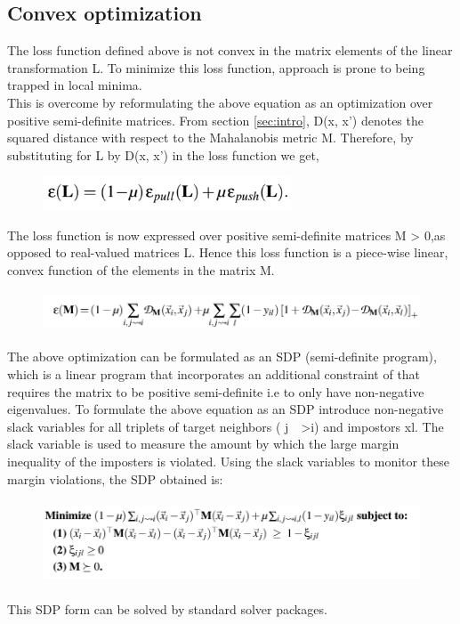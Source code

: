 \documentclass{article}
\begin{document}
\subsection{Convex optimization}
The loss function defined above is not convex in the matrix elements of the linear transformation L.
To minimize this loss function, approach is prone to being trapped in local minima.\\
This is overcome by reformulating the above equation as an optimization over positive semi-definite matrices.
From section \ref{sec:intro}, D(x, x') denotes the squared distance with respect to the Mahalanobis metric M. Therefore, by substituting for L by D(x, x') in the loss function we get,
\begin{figure}[H]
    \centering
    \includegraphics[height=1cm]{./lmnn_eq4.png}
\end{figure}
The loss function is now 
expressed over positive semi-definite matrices M > 0,as opposed to real-valued matrices L. Hence this loss function is a piece-wise linear, convex function of the elements in the matrix M.
\begin{figure}[H]
    \centering
    \includegraphics[height=1.2cm]{./lmnn_eq6.png}
\end{figure}
The above optimization can be formulated as an SDP (semi-definite program), which is a linear program that incorporates an additional constraint of that requires the matrix to be positive semi-definite i.e to only have non-negative eigenvalues.
To formulate the above equation as an SDP introduce non-negative slack variables for all triplets of target neighbors ( j~~>i) and impostors xl. The slack variable is used to measure the amount by which the large margin inequality of the imposters is violated. Using the slack variables to monitor these margin violations, the SDP obtained is:
\begin{figure}[H]
    \centering
    \includegraphics[height=2.5cm]{./lmnn_eq5.png}
\end{figure}
This SDP form can be solved by standard solver packages.
\end{document}
